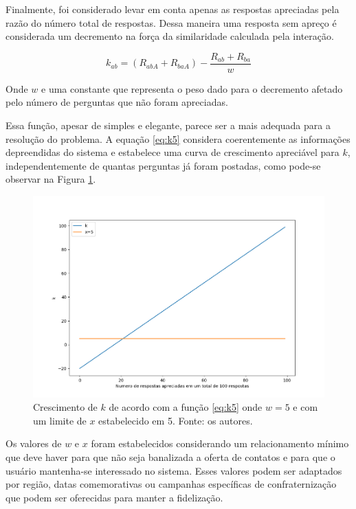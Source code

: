 Finalmente, foi considerado levar em conta apenas as respostas apreciadas pela razão do número total de respostas. Dessa maneira uma resposta sem apreço é considerada um decremento na força da similaridade calculada pela interação.

\begin{equation}
k_{ab}=(R_{abA}+R_{baA})-\frac{R_{ab}+R_{ba}}{w}
\label{eq:k5}
\end{equation}

Onde $w$ e uma constante que representa o peso dado para o decremento afetado pelo número de perguntas que não foram apreciadas.

Essa função, apesar de simples e elegante, parece ser a mais adequada para a resolução do problema. A equação \ref{eq:k5} considera coerentemente as informações depreendidas do sistema e estabelece uma curva de crescimento apreciável para $k$, independentemente de quantas perguntas já foram postadas, como pode-se observar na Figura \ref{fig:k_ultimaeq}.

\begin{figure}[!htb]
\centering
\includegraphics[width=14cm]{k_ultimaeq.png}
\caption{Crescimento de $k$ de acordo com a função \ref{eq:k5} onde $w=5$ e com um limite de $x$ estabelecido em 5. Fonte: os autores.}
\label{fig:k_ultimaeq}
\end{figure}

Os valores de $w$ e $x$ foram estabelecidos considerando um relacionamento mínimo que deve haver para que não seja banalizada a oferta de contatos e para que o usuário mantenha-se interessado no sistema. Esses valores podem ser adaptados por região, datas comemorativas ou campanhas específicas de confraternização que podem ser oferecidas para manter a fidelização.


